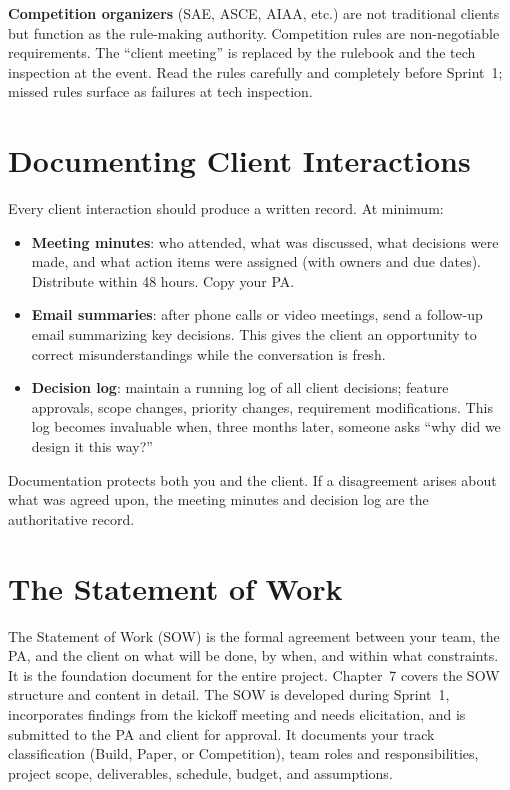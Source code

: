 \textbf{Competition organizers} (SAE, ASCE, AIAA, etc.) are not traditional clients but function as the rule-making authority. Competition rules are non-negotiable requirements. The ``client meeting'' is replaced by the rulebook and the tech inspection at the event. Read the rules carefully and completely before Sprint~1; missed rules surface as failures at tech inspection.

\section{Documenting Client Interactions}
Every client interaction should produce a written record. At minimum:
\begin{itemize}[nosep,leftmargin=1.5em]
\item \textbf{Meeting minutes}: who attended, what was discussed, what decisions were made, and what action items were assigned (with owners and due dates). Distribute within 48 hours. Copy your PA.
\item \textbf{Email summaries}: after phone calls or video meetings, send a follow-up email summarizing key decisions. This gives the client an opportunity to correct misunderstandings while the conversation is fresh.
\item \textbf{Decision log}: maintain a running log of all client decisions; feature approvals, scope changes, priority changes, requirement modifications. This log becomes invaluable when, three months later, someone asks ``why did we design it this way?''
\end{itemize}

Documentation protects both you and the client. If a disagreement arises about what was agreed upon, the meeting minutes and decision log are the authoritative record.

\section{The Statement of Work}
The Statement of Work (SOW) is the formal agreement between your team, the PA, and the client on what will be done, by when, and within what constraints. It is the foundation document for the entire project. Chapter~7 covers the SOW structure and content in detail. The SOW is developed during Sprint~1, incorporates findings from the kickoff meeting and needs elicitation, and is submitted to the PA and client for approval. It documents your track classification (Build, Paper, or Competition), team roles and responsibilities, project scope, deliverables, schedule, budget, and assumptions.


